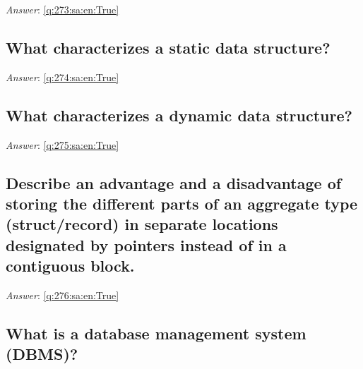 \documentclass[a4paper,11pt,oneside]{article}
\begin{document}
\begin{sloppypar}
\textit{Answer}: \autoref{q:273:sa:en:True}



\subsection{What characterizes a static data structure?}

\label{q:274:sa:en:False}

\vspace{2cm}

\noindent\makebox[\textwidth]{\hrulefill}

\vspace{1cm}

\textit{Answer}: \autoref{q:274:sa:en:True}



\subsection{What characterizes a dynamic data structure?}

\label{q:275:sa:en:False}

\vspace{2cm}

\noindent\makebox[\textwidth]{\hrulefill}

\vspace{1cm}

\textit{Answer}: \autoref{q:275:sa:en:True}



\subsection{Describe an advantage and a disadvantage of storing the different parts of an aggregate type (struct/record) in separate locations designated by pointers instead of in a contiguous block.}

\label{q:276:sa:en:False}

\vspace{2cm}

\noindent\makebox[\textwidth]{\hrulefill}

\vspace{1cm}

\textit{Answer}: \autoref{q:276:sa:en:True}



\subsection{What is a database management system (DBMS)?}


\end{sloppypar}
\end{document}
